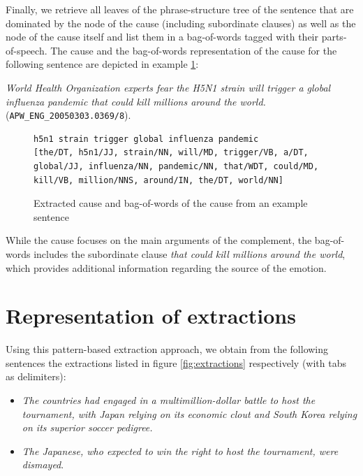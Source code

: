 Finally, we retrieve all leaves of the phrase-structure tree of the sentence that are dominated by the node of the cause (including subordinate clauses) as well as the node of the cause itself and list them in a bag-of-words tagged with their parts-of-speech. The cause and the bag-of-words representation of the cause for the following sentence are depicted in example \ref{fig:cause-bag-of-words}:

\textit{World Health Organization experts fear the H5N1 strain will trigger a global influenza pandemic that could kill millions around the world.}\\(\texttt{APW\_ENG\_20050303.0369/8}).

\begin{figure}
\begin{lstlisting}
h5n1 strain	trigger global influenza pandemic
[the/DT, h5n1/JJ, strain/NN, will/MD, trigger/VB, a/DT, global/JJ, influenza/NN, pandemic/NN, that/WDT, could/MD, kill/VB, million/NNS, around/IN, the/DT, world/NN]
\end{lstlisting}
\caption{Extracted cause and bag-of-words of the cause from an example sentence}\label{fig:cause-bag-of-words}
\end{figure}

While the cause focuses on the main arguments of the complement, the bag-of-words includes the subordinate clause \textit{that could kill millions around the world}, which provides additional information regarding the source of the emotion.

\section{Representation of extractions} \label{sec:representation}

Using this pattern-based extraction approach, we obtain from the following sentences the extractions listed in figure \ref{fig:extractions} respectively (with tabs as delimiters):

\begin{itemize}[noitemsep,nolistsep]
	\item \textit{The countries had engaged in a multimillion-dollar battle to host the tournament, with Japan relying on its economic clout and South Korea relying on its superior soccer pedigree.}
	\item \textit{The Japanese, who expected to win the right to host the tournament, were dismayed}.
\end{itemize}

